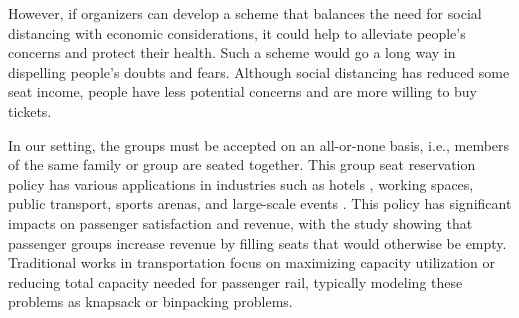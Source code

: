 However, if organizers can develop a scheme that balances the need for social distancing with economic considerations, it could help to alleviate people's concerns and protect their health. Such a scheme would go a long way in dispelling people's doubts and fears. Although social distancing has reduced some seat income, people have less potential concerns and are more willing to buy tickets.




In our setting, the groups must be accepted on an all-or-none basis, i.e., members of the same family or group are seated together. 
This group seat reservation policy has various applications in industries such as hotels \cite{li2013modeling}, working spaces\cite{fischetti2021safe}, public transport\cite{deplano2019offline}, sports arenas\cite{kwag2022optimal}, and large-scale events \cite{lewis2016creating}. This policy has significant impacts on passenger satisfaction and revenue, with the study \cite{yuen2002group} showing that passenger groups increase revenue by filling seats that would otherwise be empty. Traditional works \cite{clausen2010off, deplano2019offline}in transportation focus on maximizing capacity utilization or reducing total capacity needed for passenger rail, typically modeling these problems as knapsack or binpacking problems.

